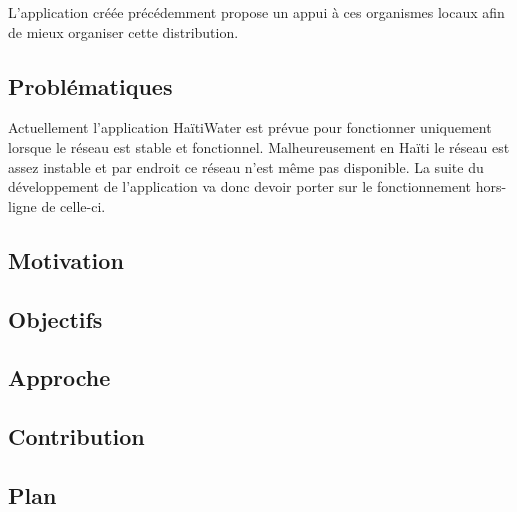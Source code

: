 \documentclass{EPL-master-thesis-covers-FR}
\begin{document}
			L'application créée précédemment propose un appui à ces organismes locaux afin de mieux organiser cette distribution. 

			

		\subsection*{Problématiques}
		
			Actuellement l'application HaïtiWater est prévue pour fonctionner uniquement lorsque le réseau est stable et fonctionnel. Malheureusement en Haïti le réseau est assez instable et par endroit ce réseau n'est même pas disponible. La suite du développement de l'application va donc devoir porter sur le fonctionnement hors-ligne de celle-ci. 


		\subsection*{Motivation}

			

		\subsection*{Objectifs}

			
		\subsection*{Approche}

			
		\subsection*{Contribution}


		\subsection*{Plan}
\end{document}
